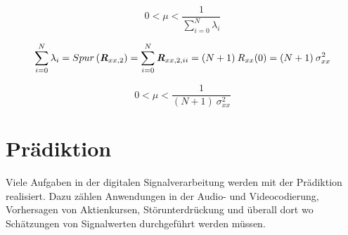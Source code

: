 \documentclass[
    10pt, %
    DIV12,
    english, %
    a5paper, %
    twoside, %
    titlepage, %
    parskip=half, %
    headings=small, %
    listof=totoc, %
    bibliography=totoc, %
    index=totoc, %
    captions=tableheading, %
    final %
]{scrbook}
\begin{document}
\begin{equation}
0 < \mu < \frac{1}{\sum\limits_{i=0}^{N}\lambda_i}\nonumber
\end{equation}

\begin{equation}
\sum_{i=0}^{N}\lambda_i=Spur\left(\textit{\textbf{R}}_{xx,2}\right)=\sum_{i=0}^{N}\textit{\textbf{R}}_{xx,2,ii}=(N+1)\:R_{xx}(0)=(N+1)\:\sigma_{xx}^2\nonumber
\end{equation}

\begin{equation}
0 < \mu < \frac{1}{(N+1)\:\sigma_{xx}^2} \nonumber
\end{equation}

\chapter{Prädiktion}
Viele Aufgaben in der digitalen Signalverarbeitung werden mit der Prädiktion realisiert. Dazu zählen Anwendungen in der Audio- und Videocodierung, Vorhersagen von Aktienkursen, 
Störunterdrückung und überall dort wo Schätzungen von Signalwerten durchgeführt werden müssen.
\end{document}
